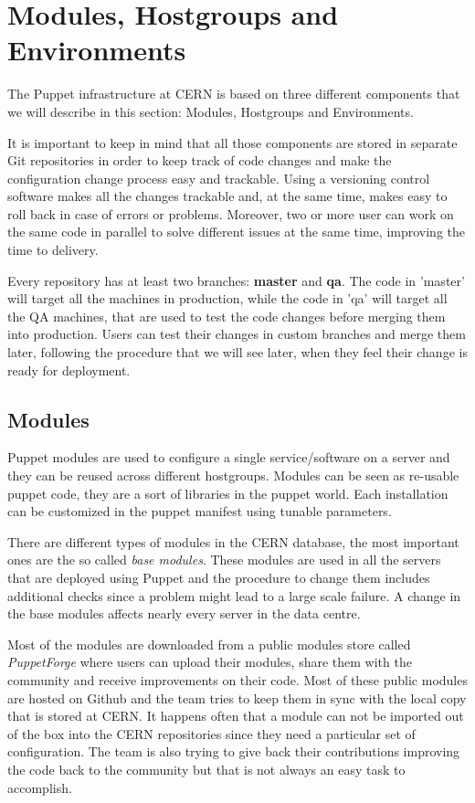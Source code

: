 \section{Modules, Hostgroups and Environments}

The Puppet infrastructure at CERN is based on three different components
that we will describe in this section: Modules, Hostgroups and
Environments.

It is important to keep in mind that all those components are stored in
separate Git repositories in order to keep track of code changes and make
the configuration change process easy and trackable. Using a versioning
control software makes all the changes trackable and, at the same time,
makes easy to roll back in case of errors or problems. Moreover, two or
more user can work on the same code in parallel to solve different issues
at the same time, improving the time to delivery.

Every repository has at least two branches: \textbf{master} and
\textbf{qa}. The code in 'master' will target all the machines in
production, while the code in 'qa' will target all the QA machines, that
are used to test the code changes before merging them into production.
Users can test their changes in custom branches and merge them later,
following the procedure that we will see later, when they feel their
change is ready for deployment.

\subsection{Modules}

Puppet modules are used to configure a single service/software on a server
and they can be reused across different hostgroups. Modules can be seen as
re-usable puppet code, they are a sort of libraries in the puppet world.
Each installation can be customized in the puppet manifest using tunable
parameters.

There are different types of modules in the CERN database, the most
important ones are the so called \textit{base modules}. These modules are
used in all the servers that are deployed using Puppet and the procedure
to change them includes additional checks since a problem might lead to
a large scale failure. A change in the base modules affects nearly every
server in the data centre.

Most of the modules are downloaded from a public modules store called
\textit{PuppetForge} where users can upload their modules, share them with the
community and receive improvements on their code. Most of these public modules
are hosted on Github and the team tries to keep them in sync with the local
copy that is stored at CERN. It happens often that a module can not be imported
out of the box into the CERN repositories since they need a particular set of
configuration. The team is also trying to give back their contributions
improving the code back to the community but that is not always an easy task to
accomplish.


